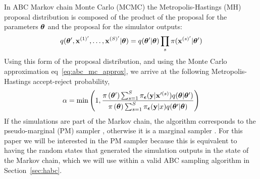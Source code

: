 \documentclass[]{article}
\begin{document}
In ABC Markov chain Monte Carlo (MCMC) \cite{marjoram2003markov,Wilkinson2013,sisson:2010} the Metropolis-Hastings (MH) proposal distribution is composed of the product of the proposal for the parameters ${\bm \theta}$ and the proposal for the simulator outputs:
\begin{equation}
  q( {\bm \theta^{\prime}}, {\bf x}^{(1)'}, \ldots, {\bf x}^{(S)'} | {\bm \theta} ) =  q( {\bm \theta^{\prime}} | {\bm \theta} ) \prod_s \pi( {\bf x}^{(s)'} | {\bm \theta^{\prime}})
\end{equation}
Using this form of the proposal distribution, and using the Monte Carlo approximation eq~\ref{eq:abc_mc_approx}, we arrive at the following Metropolis-Hastings accept-reject probability,
%
\begin{equation}
\alpha = \min \left( 1, \frac{\pi\left({\bm \theta^{\prime}}\right) \sum_{s=1}^S \pi_{{\bm {\epsilon}}}({\bf y} | {\bf x}^{\prime(s)} )  q( {\bm \theta} | {\bm \theta^{\prime}} )}{\pi\left({\bm \theta}\right) \sum_{s=1}^S \pi_{{\bm {\epsilon}}}({\bf y} | x ) q( {\bm \theta^{\prime}} | {\bm \theta} )} \right) \label{eq:abc_mh_acceptance_with_s}
\end{equation}
%
If the simulations are part of the Markov chain, the algorithm corresponds to the pseudo-marginal (PM) sampler \cite{delmoral2008,andrieu2009pseudo}, otherwise it is a marginal sampler \cite{marjoram2003markov,sisson:2010}.   For this paper we will be interested in the PM sampler because this is equivalent to having the random states that generated the simulation outputs in the state of the Markov chain, which we will use within a valid ABC sampling algorithm in Section~\ref{sec:habc}.
%
\end{document}
